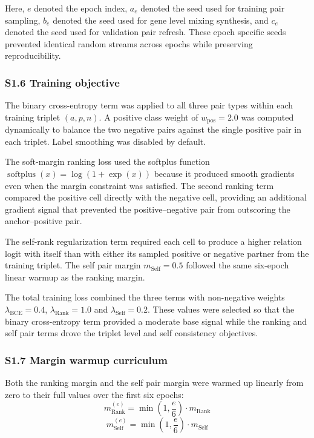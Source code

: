 \documentclass[11pt]{article}
\begin{document}
Here, \(e\) denoted the epoch index, \(a_e\) denoted the seed used for training pair sampling, \(b_e\) denoted the seed used for gene level mixing synthesis, and \(c_e\) denoted the seed used for validation pair refresh. These epoch specific seeds prevented identical random streams across epochs while preserving reproducibility.

\subsubsection*{S1.6 Training objective}

The binary cross-entropy term was applied to all three pair types within each training triplet \((a,p,n)\). A positive class weight of \(w_{\mathrm{pos}}=2.0\) was computed dynamically to balance the two negative pairs against the single positive pair in each triplet. Label smoothing was disabled by default.

The soft-margin ranking loss used the softplus function \(\operatorname{softplus}(x)=\log(1+\exp(x))\) because it produced smooth gradients even when the margin constraint was satisfied. The second ranking term compared the positive cell directly with the negative cell, providing an additional gradient signal that prevented the positive--negative pair from outscoring the anchor--positive pair.

The self-rank regularization term required each cell to produce a higher relation logit with itself than with either its sampled positive or negative partner from the training triplet. The self pair margin \(m_{\mathrm{Self}}=0.5\) followed the same six-epoch linear warmup as the ranking margin.

The total training loss combined the three terms with non-negative weights \(\lambda_{\mathrm{BCE}}=0.4\), \(\lambda_{\mathrm{Rank}}=1.0\) and \(\lambda_{\mathrm{Self}}=0.2\). These values were selected so that the binary cross-entropy term provided a moderate base signal while the ranking and self pair terms drove the triplet level and self consistency objectives.

\subsubsection*{S1.7 Margin warmup curriculum}

Both the ranking margin and the self pair margin were warmed up linearly from zero to their full values over the first six epochs:
\begin{equation}
m_{\mathrm{Rank}}^{(e)} = \min\left(1, \frac{e}{6}\right)\cdot m_{\mathrm{Rank}}
\label{eq:supp_margin_warmup_rank}
\end{equation}
\begin{equation}
m_{\mathrm{Self}}^{(e)} = \min\left(1, \frac{e}{6}\right) \cdot m_{\mathrm{Self}}
\label{eq:supp_margin_warmup_self}
\end{equation}
\end{document}
